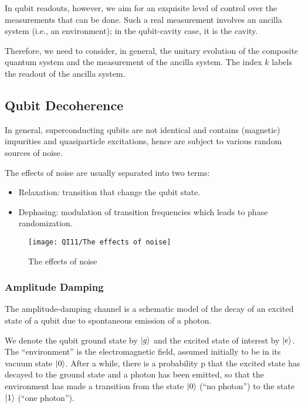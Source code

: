 In qubit readouts, however, we aim for an exquisite level of control over the measurements that can be done. Such a real measurement involves an ancilla system (i.e., an environment); in the qubit-cavity case, it is the cavity.

Therefore, we need to consider, in general, the unitary evolution of the composite quantum system and the measurement of the ancilla system. The index $k$ labels the readout of the ancilla system.


\subsection{Qubit Decoherence}
In general, superconducting qubits are not identical and contains (magnetic) impurities and quasiparticle excitations, hence are subject to various random sources of noise. 

The effects of noise are usually separated into two terms: 
\begin{itemize}\small
    \item Relaxation: transition that change the qubit state.
    \item Dephasing: modulation of transition frequencies which leads to phase randomization.
\end{itemize}

\begin{figure}[!htb]
    \centering
    \texttt{[image: QI11/The effects of noise]}
    \caption{The effects of noise}
\end{figure}

\subsubsection{Amplitude Damping}
The amplitude-damping channel is a schematic model of the decay of an excited state of a qubit due to spontaneous emission of a photon.

We denote the qubit ground state by $\ket{g}$ and the excited state of interest by $\ket{e}$. The ``environment'' is the electromagnetic field, assumed initially to be in its vacuum state $\ket{0}$. After a while, there is a probability p that the excited state has decayed to the ground state and a photon has been emitted, so that the environment has made a transition from the state $\ket{0}$ (``no photon'') to the state $\ket{1}$ (``one photon'').

